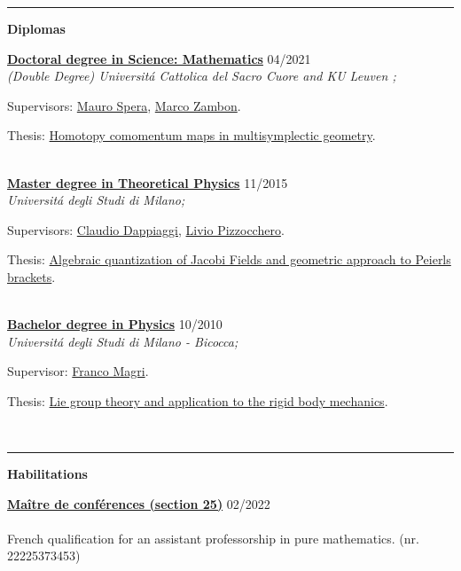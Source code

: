 \documentclass[a4paper]{article}
\newcommand{\block}[1]{\hrule \vspace{0.2cm} \textbf{\Large #1} \vspace{0.2cm}}
\newcommand{\voice}[5]{\href{#4}{\textbf{#1}} \hfill #2 \\ \textit{#3} \\ {\small #5} \vspace{0.2cm} \\}
\begin{document}

	\block{Diplomas}

	\voice{Doctoral degree in Science: Mathematics}
		{04/2021}
		{(Double Degree) Universit\'a Cattolica del Sacro Cuore and KU Leuven ;}
		{https://web.archive.org/save/http://scuoledidottorato.unicatt.it/phdschools/science-research-projects}       
		{Supervisors: \href{http://docenti.unicatt.it/ita/mauro_spera/}{Mauro Spera}, \href{https://perswww.kuleuven.be/~u0096206/}{Marco Zambon}. \par Thesis: \href{https://limo.libis.be/primo-explore/fulldisplay?docid=LIRIAS3408626&context=L&vid=KULeuven&search_scope=ALL_CONTENT&tab=all_content_tab&lang=en_US}{Homotopy comomentum maps in multisymplectic geometry}.}
	\voice{Master degree in Theoretical Physics}
		{11/2015}
		{Universit\'a degli Studi di Milano;}
		{https://fisica-lm.cdl.unimi.it/it}       
		{Supervisors: \href{http://fisica.unipv.it/personale/Persona.php?ID=256}{Claudio Dappiaggi}, \href{http://users.mat.unimi.it/users/pizzocchero/}{Livio Pizzocchero}. \par Thesis: \href{https://www.researchgate.net/publication/295548746_Algebraic_quantization_of_Jacobi_fields_and_geometric_approach_to_Peierls_brackets}{Algebraic quantization of Jacobi Fields and geometric approach to Peierls brackets}.}
	\voice{Bachelor degree in Physics}
		{10/2010}
		{Universit\'a degli Studi di Milano - Bicocca;}
		{https://www.fisica.unimib.it/en}       
		{Supervisor: \href{http://staff.matapp.unimib.it/~/magri/}{Franco Magri}. \par Thesis: \href{https://github.com/MasterToninus/TesiTriennale/blob/master/tesi.pdf}{Lie group theory and application to the rigid body mechanics}.}


	\block{Habilitations}

	\voice{Maître de conférences (section 25)}
		{02/2022}
		{\vspace{-0.5cm}}
		{https://www.galaxie.enseignementsup-recherche.gouv.fr/ensup/qualification/Resultats_2022/qualifies_MCF_2022.pdf}       
		{French qualification for an assistant professorship in pure mathematics.  (nr. 22225373453)}
\end{document}
